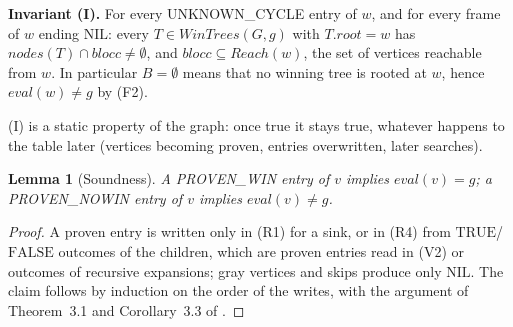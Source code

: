 \documentclass{article}
\theoremstyle{plain}
\newtheorem{lemma}[theorem]{Lemma}
\theoremstyle{definition}
\theoremstyle{remark}
\newcommand{\eval}{\mathit{eval}}
\newcommand{\nodes}{\mathit{nodes}}
\newcommand{\WinTrees}{\mathit{WinTrees}}
\newcommand{\Reach}{\mathit{Reach}}
\newcommand{\TRUE}{\ensuremath{\mathrm{TRUE}}}
\newcommand{\FALSE}{\ensuremath{\mathrm{FALSE}}}
\newcommand{\NIL}{\ensuremath{\mathrm{NIL}}}
\newcommand{\PW}{\textsf{PROVEN\_WIN}}
\newcommand{\PN}{\textsf{PROVEN\_NOWIN}}
\newcommand{\UC}{\textsf{UNKNOWN\_CYCLE}}
\begin{document}
\noindent\textbf{Invariant (I).} For every \UC{} entry of $w$, and for every frame of $w$ ending \NIL{}: every $T \in \WinTrees(G, g)$ with $T.\mathit{root} = w$ has $\nodes(T) \cap \mathit{blocc} \neq \emptyset$, and $\mathit{blocc} \subseteq \Reach(w)$, the set of vertices reachable from $w$. In particular $B = \emptyset$ means that no winning tree is rooted at $w$, hence $\eval(w) \neq g$ by (F2).

(I) is a static property of the graph: once true it stays true, whatever happens to the table later (vertices becoming proven, entries overwritten, later searches).

\begin{lemma}[Soundness]\label{lem:sound}
A \PW{} entry of $v$ implies $\eval(v) = g$; a \PN{} entry of $v$ implies $\eval(v) \neq g$.
\end{lemma}
\begin{proof}
A proven entry is written only in (R1) for a sink, or in (R4) from \TRUE{}/\FALSE{} outcomes of the children, which are proven entries read in (V2) or outcomes of recursive expansions; gray vertices and skips produce only \NIL{}. The claim follows by induction on the order of the writes, with the argument of Theorem~3.1 and Corollary~3.3 of \cite{romano2026}.
\end{proof}
\end{document}
